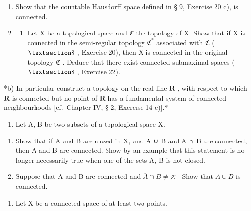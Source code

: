 \BourbakiExerciseGroup

\begin{enumerate}
\def\labelenumi{\arabic{enumi})}
\item
  Show that the countable Hausdorff space defined in § 9, Exercise 20 c), is connected.
\item
  \begin{enumerate}
  \def\labelenumii{\alph{enumii})}
  \tightlist
  \item
    Let X be a topological space and \(\mathfrak{C}\) the topology of X. Show that if X is connected in the semi-regular topology \(\mathfrak{C}^*\) associated with \(\mathfrak{C}\) ( \(\S 8\) , Exercise 20), then X is connected in the original topology \(\mathfrak{C}\) . Deduce that there exist connected submaximal spaces ( \(\S 8\) , Exercise 22).
  \end{enumerate}
\end{enumerate}

*b) In particular construct a topology on the real line \(\mathbf{R}\) , with respect to which \(\mathbf{R}\) is connected but no point of \(\mathbf{R}\) has a fundamental system of connected neighbourhoods {[}cf.~Chapter IV, § 2, Exercise 14 c){]}.*

\begin{enumerate}
\def\labelenumi{\arabic{enumi})}
\setcounter{enumi}{2}
\tightlist
\item
  Let A, B be two subsets of a topological space X.
\end{enumerate}

\begin{enumerate}
\def\labelenumi{\alph{enumi})}
\item
  Show that if A and B are closed in X, and A ∪ B and A ∩ B are connected, then A and B are connected. Show by an example that this statement is no longer necessarily true when one of the sets A, B is not closed.
\item
  Suppose that A and B are connected and \(\overline{A} \cap B \neq \varnothing\) . Show that \(A \cup B\) is connected.
\end{enumerate}

\begin{enumerate}
\def\labelenumi{\arabic{enumi})}
\setcounter{enumi}{3}
\tightlist
\item
  Let X be a connected space of at least two points.
\end{enumerate}

